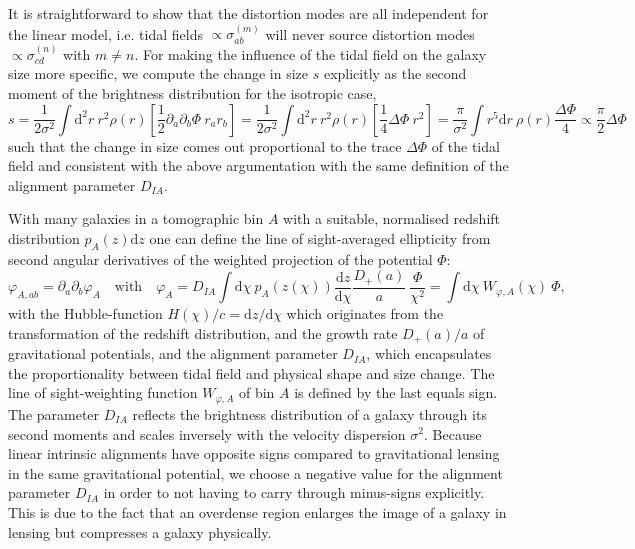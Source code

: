 \documentclass[a4paper,fleqn,usenatbib]{mnras}
\newcommand{\dd}{\mathrm{d}}
\begin{document}
It is straightforward to show that the distortion modes are all independent for the linear model, i.e. tidal fields $\propto\sigma^{(m)}_{ab}$ will never source distortion modes $\propto\sigma^{(n)}_{cd}$ with $m\neq n$. For making the influence of the tidal field on the galaxy size more specific, we compute the change in size $s$ explicitly as the second moment of the brightness distribution for the isotropic case,
\begin{equation}
s = 
\frac{1}{2\sigma^2}\int\dd^2r\:r^2\rho(r)\left[\frac{1}{2}\partial_a\partial_b\Phi\: r_ar_b\right] =
\frac{1}{2\sigma^2}\int\dd^2r\:r^2\rho(r)\left[\frac{1}{4}\Delta\Phi\:r^2\right] = 
\frac{\pi}{\sigma^2}\int r^5\dd r\:\rho(r)\frac{\Delta\Phi}{4} \propto \frac{\pi}{2}\Delta\Phi
\end{equation}
such that the change in size comes out proportional to the trace $\Delta\Phi$ of the tidal field and consistent with the above argumentation with the same definition of the alignment parameter $D_{IA}$. 

With many galaxies in a tomographic bin $A$ with a suitable, normalised redshift distribution $p_A(z)\dd z$ one can define the line of sight-averaged ellipticity from second angular derivatives of the weighted projection of the potential $\Phi$:
\begin{equation}
\varphi_{A,ab} = \partial_a\partial_b\varphi_A
\quad\mathrm{with}\quad
\varphi_A = D_{IA}\int\dd\chi\:p_A(z(\chi))\frac{\dd z}{\dd\chi}\frac{D_+(a)}{a}\:\frac{\Phi}{\chi^2} = \int\dd\chi\:W_{\varphi,A}(\chi)\:\Phi,
\label{eqn_ia_los}
\end{equation}
with the Hubble-function $H(\chi)/c = \dd z/\dd\chi$ which originates from the transformation of the redshift distribution, and the growth rate $D_+(a)/a$ of gravitational potentials, and the alignment parameter $D_{IA}$, which encapsulates the proportionality between tidal field and physical shape and size change. The line of sight-weighting function $W_{\varphi,A}$ of bin $A$ is defined by the last equals sign. The parameter $D_{IA}$ reflects the brightness distribution of a galaxy through its second moments and scales inversely with the velocity dispersion $\sigma^2$. Because linear intrinsic alignments have opposite signs compared to gravitational lensing in the same gravitational potential, we choose a negative value for the alignment parameter $D_{IA}$ in order to not having to carry through minus-signs explicitly. This is due to the fact that an overdense region enlarges the image of a galaxy in lensing but compresses a galaxy physically.
\end{document}
